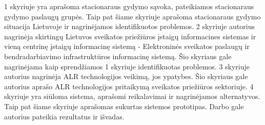 1 skyriuje yra aprašoma stacionaraus gydymo sąvoka, pateikiamos stacionaraus gydymo paslaugų grupės. Taip pat šiame skyriuje aprašoma stacionaraus gydymo situacija Lietuvoje ir nagrinėjamos identifikuotos problemos. 2 skyriuje autorius nagrinėja skirtingų Lietuvos sveikatos priežiūros įstaigų informacines sistemas ir vieną centrinę įstaigų informacinę sistemą - Elektroninės sveikatos paslaugų ir bendradarbiavimo infrastruktūros informacinę sistemą. Šio skyriaus gale nagrinėjama kaip sprendžiamos 1 skyriuje identifikuotas problemos. 3 skyriuje autorius nagrinėja ALR technologijos veikimą, jos ypatybes. Šio skyriaus gale autorius aprašo ALR technologijos pritaikymą sveikatos priežiūros sektoriuje. 4 skyriuje yra siūloma sistema, aprašomi reikalavimai ir nagrinėjamos alternatyvos. Taip pat šiame skyriuje aprašomas sukurtas sistemos prototipas. Darbo gale autorius pateikia rezultatus ir išvadas.





